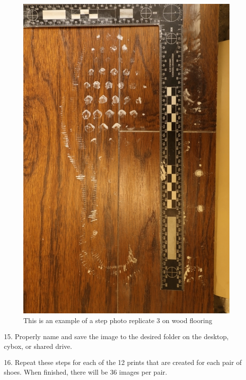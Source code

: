 \begin{figure}[!htp]
\centering
\includegraphics[scale=1.3]{Wood3.png}
\caption{This is an example of a step photo replicate 3 on wood flooring }
\label{Figure 9}
\end{figure}

15. Properly name and save the image to the desired folder on the desktop, cybox, or shared drive.

16. Repeat these steps for each of the 12 prints that are created for each pair of shoes. When finished, there will be 36 images per pair.





